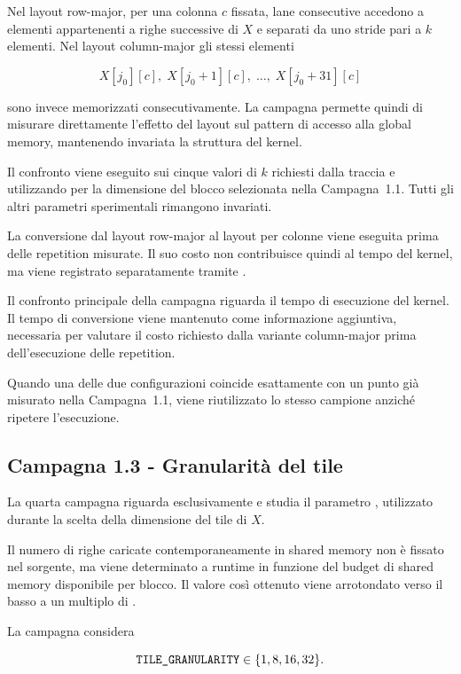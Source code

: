 Nel layout row-major, per una colonna $c$ fissata, lane consecutive
accedono a elementi appartenenti a righe successive di $X$ e separati da
uno stride pari a $k$ elementi. Nel layout column-major gli stessi elementi

\[
X[j_0][c],\;
X[j_0+1][c],\;
\ldots,\;
X[j_0+31][c]
\]

sono invece memorizzati consecutivamente. La campagna permette quindi di
misurare direttamente l'effetto del layout sul pattern di accesso alla
global memory, mantenendo invariata la struttura del kernel.

Il confronto viene eseguito sui cinque valori di $k$ richiesti dalla
traccia e utilizzando per  la dimensione del blocco
selezionata nella Campagna~1.1. Tutti gli altri parametri sperimentali
rimangono invariati.

La conversione dal layout row-major al layout per colonne viene eseguita
prima delle repetition misurate. Il suo costo non contribuisce quindi al
tempo del kernel, ma viene registrato separatamente tramite
.

Il confronto principale della campagna riguarda il tempo di esecuzione del
kernel. Il tempo di conversione viene mantenuto come informazione
aggiuntiva, necessaria per valutare il costo richiesto dalla variante
column-major prima dell'esecuzione delle repetition.

Quando una delle due configurazioni coincide esattamente con un punto già
misurato nella Campagna~1.1, viene riutilizzato lo stesso campione anziché
ripetere l'esecuzione.

\subsection{Campagna 1.3 - Granularità del tile}
\label{sec:camp-granularita}

La quarta campagna riguarda esclusivamente
 e studia il parametro
, utilizzato durante la scelta della dimensione
del tile di $X$.

Il numero di righe caricate contemporaneamente in shared memory non è
fissato nel sorgente, ma viene determinato a runtime in funzione del
budget di shared memory disponibile per blocco. Il valore così ottenuto
viene arrotondato verso il basso a un multiplo di
.

La campagna considera

\[
\texttt{TILE\_GRANULARITY}
\in
\{1,8,16,32\}.
\]

